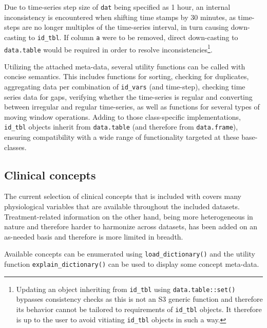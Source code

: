 \documentclass[
  notitle]{jss}
\begin{document}
Due to time-series step size of \texttt{dat} being specified as 1 hour,
an internal inconsistency is encountered when shifting time stamps by 30
minutes, as time-steps are no longer multiples of the time-series
interval, in turn causing down-casting to \texttt{id\_tbl}. If column
\texttt{a} were to be removed, direct down-casting to
\texttt{data.table} would be required in order to resolve
inconsistencies\footnote{Updating an object inheriting from
  \texttt{id\_tbl} using \texttt{data.table::set()} bypasses consistency
  checks as this is not an S3 generic function and therefore its
  behavior cannot be tailored to requirements of \texttt{id\_tbl}
  objects. It therefore is up to the user to avoid vitiating
  \texttt{id\_tbl} objects in such a way.}.

Utilizing the attached meta-data, several utility functions can be
called with concise semantics. This includes functions for sorting,
checking for duplicates, aggregating data per combination of
\texttt{id\_vars} (and time-step), checking time series data for gaps,
verifying whether the time-series is regular and converting between
irregular and regular time-series, as well as functions for several
types of moving window operations. Adding to those class-specific
implementations, \texttt{id\_tbl} objects inherit from
\texttt{data.table} (and therefore from \texttt{data.frame}), ensuring
compatibility with a wide range of functionality targeted at these
base-classes.

\hypertarget{clinical-concepts}{%
\subsection{Clinical concepts}\label{clinical-concepts}}

The current selection of clinical concepts that is included with
 covers many physiological variables that are available
throughout the included datasets. Treatment-related information on the
other hand, being more heterogeneous in nature and therefore harder to
harmonize across datasets, has been added on an as-needed basis and
therefore is more limited in breadth.

Available concepts can be enumerated using \texttt{load\_dictionary()}
and the utility function \texttt{explain\_dictionary()} can be used to
display some concept meta-data.
\end{document}
